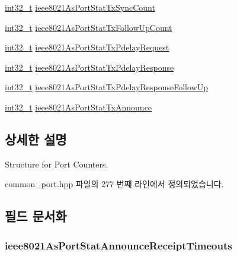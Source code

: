 \begin{DoxyCompactItemize}
\item 
\hyperlink{parse_8c_a37994e3b11c72957c6f454c6ec96d43d}{int32\+\_\+t} \hyperlink{struct_port_counters__t_abaebe28dd0ed5e666715ddf3eb82058c}{ieee8021\+As\+Port\+Stat\+Tx\+Sync\+Count}
\item 
\hyperlink{parse_8c_a37994e3b11c72957c6f454c6ec96d43d}{int32\+\_\+t} \hyperlink{struct_port_counters__t_adeb77baca99e169ec31916a95e5cd455}{ieee8021\+As\+Port\+Stat\+Tx\+Follow\+Up\+Count}
\item 
\hyperlink{parse_8c_a37994e3b11c72957c6f454c6ec96d43d}{int32\+\_\+t} \hyperlink{struct_port_counters__t_a6da081189847c8316c81d08c639dd412}{ieee8021\+As\+Port\+Stat\+Tx\+Pdelay\+Request}
\item 
\hyperlink{parse_8c_a37994e3b11c72957c6f454c6ec96d43d}{int32\+\_\+t} \hyperlink{struct_port_counters__t_a699064a3507a0d009de15645ca876d23}{ieee8021\+As\+Port\+Stat\+Tx\+Pdelay\+Response}
\item 
\hyperlink{parse_8c_a37994e3b11c72957c6f454c6ec96d43d}{int32\+\_\+t} \hyperlink{struct_port_counters__t_a6301a36e0490db4e2d6d7a6953c7c9f7}{ieee8021\+As\+Port\+Stat\+Tx\+Pdelay\+Response\+Follow\+Up}
\item 
\hyperlink{parse_8c_a37994e3b11c72957c6f454c6ec96d43d}{int32\+\_\+t} \hyperlink{struct_port_counters__t_a6353f3f65fa6d3251640e29174ce6120}{ieee8021\+As\+Port\+Stat\+Tx\+Announce}
\end{DoxyCompactItemize}


\subsection{상세한 설명}
Structure for Port Counters. 

common\+\_\+port.\+hpp 파일의 277 번째 라인에서 정의되었습니다.



\subsection{필드 문서화}
\subsubsection[{\texorpdfstring{ieee8021\+As\+Port\+Stat\+Announce\+Receipt\+Timeouts}{ieee8021AsPortStatAnnounceReceiptTimeouts}}]{ ieee8021\+As\+Port\+Stat\+Announce\+Receipt\+Timeouts}\hypertarget{struct_port_counters__t_aaddd94015d8842fb411a4204293737fb}{}\label{struct_port_counters__t_aaddd94015d8842fb411a4204293737fb}


